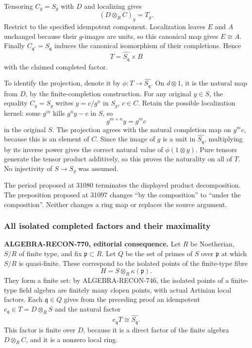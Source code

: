 Tensoring \(C_g=S_g\) with \(D\) and localizing gives \[
 (D\otimes_R C)_g=T_g.
\] Restrict to the specified idempotent component. Localization leaves \(E\) and \(A\) unchanged because their \(g\)-images are units, so this canonical map gives \(E\cong A\). Finally \(C_{\mathfrak q'}=S_{\mathfrak q}\) induces the canonical isomorphism of their completions. Hence \[
 T=\widehat{S_{\mathfrak q}}\times B
\] with the claimed completed factor.

To identify the projection, denote it by \(\phi:T\to\widehat{S_{\mathfrak q}}\). On \(d\otimes1\), it is the natural map from \(D\), by the finite-completion construction. For any original \(y\in S\), the equality \(C_g=S_g\) writes \(y=c/g^n\) in \(S_g\), \(c\in C\). Retain the possible localization kernel: some \(g^m\) kills \(g^ny-c\) in \(S\), so \[
 g^{m+n}y=g^m c
\] in the original \(S\). The projection agrees with the natural completion map on \(g^mc\), because this is an element of \(C\). Since the image of \(g\) is a unit in \(\widehat{S_{\mathfrak q}}\), multiplying by its inverse power gives the correct natural value of \(\phi(1\otimes y)\). Pure tensors generate the tensor product additively, so this proves the naturality on all of \(T\). No injectivity of \(S\to S_g\) was assumed.

The period proposed at 31080 terminates the displayed product decomposition. The preposition proposed at 31097 changes ``by the composition'' to ``under the composition''. Neither changes a ring map or replaces the source argument.

\subsubsection{All isolated completed factors and their maximality}\label{algebra-proof-033-all-isolated-completed-factors-and-their-maximality}

\textbf{ALGEBRA-\AlgebraIdentifierBreak{}RECON-\AlgebraIdentifierBreak{}770, editorial consequence.} Let \(R\) be Noetherian, \(S/R\) of finite type, and fix \(\mathfrak p\subset R\). Let \(Q\) be the set of primes of \(S\) over \(\mathfrak p\) at which \(S/R\) is quasi-finite. These correspond to the isolated points of the finite-type fibre \[
 H=S\otimes_R\kappa(\mathfrak p).
\] They form a finite set: by ALGEBRA-\AlgebraIdentifierBreak{}RECON-\AlgebraIdentifierBreak{}746, the isolated points of a finite-type field algebra are finitely many clopen points, with actual Artinian local factors. Each \(\mathfrak q\in Q\) gives from the preceding proof an idempotent \(e_{\mathfrak q}\in T=D\otimes_R S\) and the natural factor \[
 e_{\mathfrak q}T\cong\widehat{S_{\mathfrak q}}.
\] This factor is finite over \(D\), because it is a direct factor of the finite algebra \(D\otimes_R C\), and it is a nonzero local ring.

